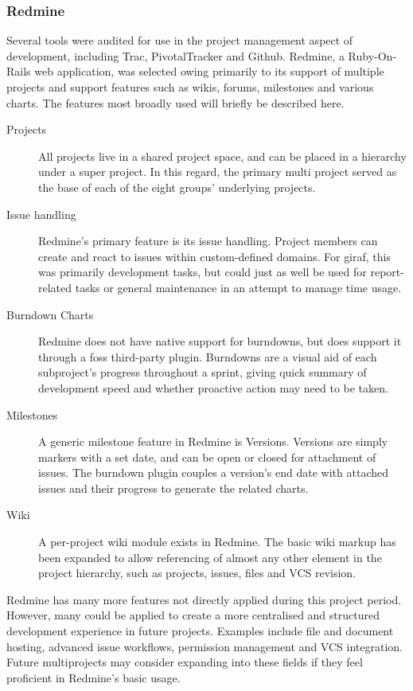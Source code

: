 \subsubsection{Redmine}
\label{subsub:redmine}
Several tools were audited for use in the project management aspect of development, including Trac, PivotalTracker and Github. Redmine, a Ruby-On-Rails web application, was selected owing primarily to its support of multiple projects and support features such as wikis, forums, milestones and various charts. The features most broadly used will briefly be described here.
\begin{description}
	\item[Projects] All projects live in a shared project space, and can be placed in a hierarchy under a super project. In this regard, the primary multi project served as the base of each of the eight groups' underlying projects.
	\item[Issue handling] Redmine's primary feature is its issue handling. Project members can create and react to issues within custom-defined domains. For \ac{giraf}, this was primarily development tasks, but could just as well be used for report-related tasks or general maintenance in an attempt to manage time usage.
	\item[Burndown Charts] Redmine does not have native support for burndowns, but does support it through a \ac{foss} third-party plugin. Burndowns are a visual aid of each subproject's progress throughout a sprint, giving quick summary of development speed and whether proactive action may need to be taken.
	\item[Milestones] A generic milestone feature in Redmine is Versions. Versions are simply markers with a set date, and can be open or closed for attachment of issues. The burndown plugin couples a version's end date with attached issues and their progress to generate the related charts.
	\item[Wiki] A per-project wiki module exists in Redmine. The basic wiki markup has been expanded to allow referencing of almost any other element in the project hierarchy, such as projects, issues, files and VCS revision.
\end{description}

Redmine has many more features not directly applied during this project period. However, many could be applied to create a more centralised and structured development experience in future projects. Examples include file and document hosting, advanced issue workflows, permission management and VCS integration. Future multiprojects may consider expanding into these fields if they feel proficient in Redmine's basic usage.

